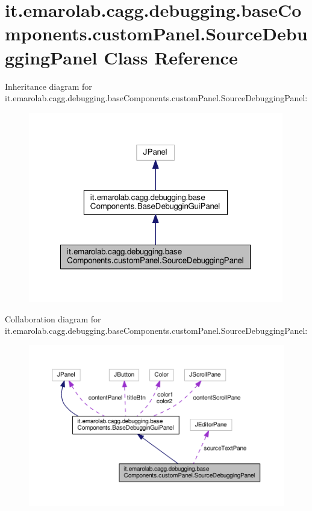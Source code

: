\hypertarget{classit_1_1emarolab_1_1cagg_1_1debugging_1_1baseComponents_1_1customPanel_1_1SourceDebuggingPanel}{\section{it.\-emarolab.\-cagg.\-debugging.\-base\-Components.\-custom\-Panel.\-Source\-Debugging\-Panel Class Reference}
\label{classit_1_1emarolab_1_1cagg_1_1debugging_1_1baseComponents_1_1customPanel_1_1SourceDebuggingPanel}
}


Inheritance diagram for it.\-emarolab.\-cagg.\-debugging.\-base\-Components.\-custom\-Panel.\-Source\-Debugging\-Panel\-:\nopagebreak
\begin{figure}[H]
\begin{center}
\leavevmode
\includegraphics[width=316pt]{classit_1_1emarolab_1_1cagg_1_1debugging_1_1baseComponents_1_1customPanel_1_1SourceDebuggingPanel__inherit__graph}
\end{center}
\end{figure}


Collaboration diagram for it.\-emarolab.\-cagg.\-debugging.\-base\-Components.\-custom\-Panel.\-Source\-Debugging\-Panel\-:\nopagebreak
\begin{figure}[H]
\begin{center}
\leavevmode
\includegraphics[width=350pt]{classit_1_1emarolab_1_1cagg_1_1debugging_1_1baseComponents_1_1customPanel_1_1SourceDebuggingPanel__coll__graph}
\end{center}
\end{figure}
